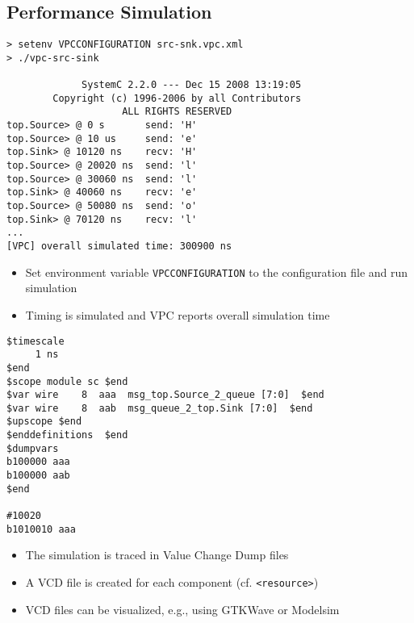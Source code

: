 \subsection{Performance Simulation}


\begin{frame}[fragile=singleslide]
\begin{lstlisting}
> setenv VPCCONFIGURATION src-snk.vpc.xml
> ./vpc-src-sink

             SystemC 2.2.0 --- Dec 15 2008 13:19:05
        Copyright (c) 1996-2006 by all Contributors
                    ALL RIGHTS RESERVED            
top.Source> @ 0 s       send: 'H'
top.Source> @ 10 us     send: 'e'
top.Sink> @ 10120 ns    recv: 'H'
top.Source> @ 20020 ns  send: 'l'
top.Source> @ 30060 ns  send: 'l'
top.Sink> @ 40060 ns    recv: 'e'
top.Source> @ 50080 ns  send: 'o'
top.Sink> @ 70120 ns    recv: 'l'
...
[VPC] overall simulated time: 300900 ns
\end{lstlisting}
\begin{itemize}
\item Set environment variable \lstinline!VPCCONFIGURATION! to the configuration file and run simulation
\item Timing is simulated and VPC reports overall simulation time 
\end{itemize}
\end{frame}


\begin{frame}[fragile=singleslide]
\begin{lstlisting}
$timescale
     1 ns
$end
$scope module sc $end
$var wire    8  aaa  msg_top.Source_2_queue [7:0]  $end
$var wire    8  aab  msg_queue_2_top.Sink [7:0]  $end
$upscope $end
$enddefinitions  $end
$dumpvars
b100000 aaa
b100000 aab
$end

#10020
b1010010 aaa
\end{lstlisting}
\begin{itemize}
\item The simulation is traced in Value Change Dump files
\item A VCD file is created for each component (cf. \lstinline!<resource>!)
\item VCD files can be visualized, e.g., using GTKWave or Modelsim
\end{itemize}
\end{frame}


